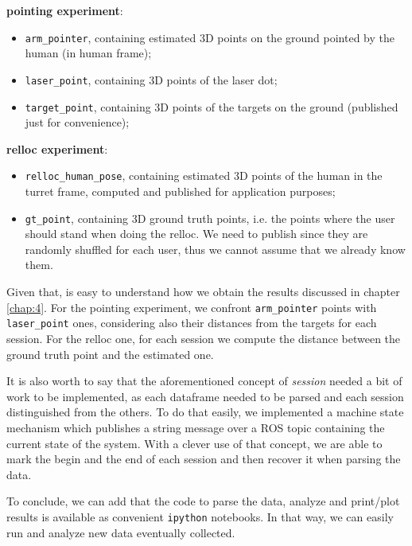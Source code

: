 \textbf{pointing experiment}:
\begin{itemize}
    \item \texttt{arm\_pointer}, containing estimated 3D points on the ground pointed by the human (in human frame);
    \item \texttt{laser\_point}, containing 3D points of the laser dot;
    \item \texttt{target\_point}, containing 3D points of the targets on the ground (published just for convenience);
\end{itemize}
\textbf{relloc experiment}:
\begin{itemize}
    \item \texttt{relloc\_human\_pose}, containing estimated 3D points of the human in the turret frame, computed and published for application purposes;
    \item \texttt{gt\_point}, containing 3D ground truth points, i.e. the points where the user should stand when doing the relloc. We need to publish since they are randomly shuffled for each user, thus we cannot assume that we already know them.
\end{itemize}
Given that, is easy to understand how we obtain the results discussed in chapter \ref{chap:4}. For the pointing experiment, we confront \texttt{arm\_pointer} points with \texttt{laser\_point} ones, considering also their distances from the targets for each session. For the relloc one, for each session we compute the distance between the ground truth point and the estimated one.

It is also worth to say that the aforementioned concept of \textit{session} needed a bit of work to be implemented, as each dataframe needed to be parsed and each session distinguished from the others. To do that easily, we implemented a machine state mechanism which publishes a string message over a ROS topic containing the current state of the system. With a clever use of that concept, we are able to mark the begin and the end of each session and then recover it when parsing the data.

To conclude, we can add that the code to parse the data, analyze and print/plot results is available as convenient \texttt{ipython} notebooks. In that way, we can easily run and analyze new data eventually collected.